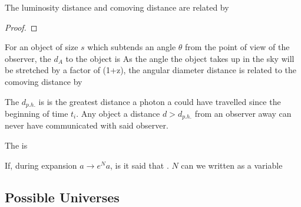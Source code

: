 \documentclass{article}
\begin{document}
 \begin{prop}
 The luminosity distance and comoving distance are related by 
 \end{prop}
\begin{proof}
\end{proof}

\begin{definition}
For an object of size $s$ which subtends an angle $\theta$ from the point of view of the observer, the  $d_A$ to the object is 
As the angle the object takes up in the sky will be stretched by a factor of (1+z), the angular diameter distance is related to the comoving distance by 
\end{definition}

\begin{definition}
The  $d_{p.h.}$ is is the greatest distance a photon a could have travelled since the beginning of time $t_i$. Any object a distance $d>d_{p.h.}$ from an observer away can never have communicated with said observer. 
\end{definition}

\begin{definition}
The  is 
\end{definition}

\begin{definition}[e-folds]
If, during expansion $a \to e^N a$, is it said that . $N$ can we written as a variable 
\end{definition}

\subsection{Possible Universes}
\end{document}
